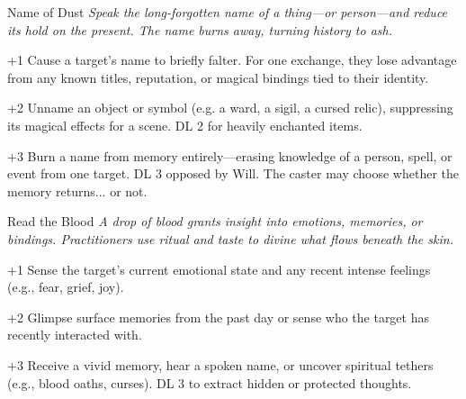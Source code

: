 \begin{WyrdSpell}[Ashcraft]{Name of Dust}\label{spell:name-of-dust}
    \textit{Speak the long-forgotten name of a thing—or person—and reduce its hold on the present. The name burns away, turning history to ash.}
    
    \begin{WyrdSpellBlock}
        \item[+1] Cause a target’s name to briefly falter. For one exchange, they lose advantage from any known titles, reputation, or magical bindings tied to their identity.
        
        \item[+2] Unname an object or symbol (e.g. a ward, a sigil, a cursed relic), suppressing its magical effects for a scene. DL 2 for heavily enchanted items.
        
        \item[+3] Burn a name from memory entirely—erasing knowledge of a person, spell, or event from one target. DL 3 opposed by Will. The caster may choose whether the memory returns... or not.
    \end{WyrdSpellBlock}
\end{WyrdSpell}

\begin{WyrdSpell}[Bloodbinding]{Read the Blood}\label{spell:read-the-blood}
\textit{A drop of blood grants insight into emotions, memories, or bindings. Practitioners use ritual and taste to divine what flows beneath the skin.}
    \begin{WyrdSpellBlock}
        \item[+1] Sense the target's current emotional state and any recent intense feelings (e.g., fear, grief, joy).
        \item[+2] Glimpse surface memories from the past day or sense who the target has recently interacted with.
        \item[+3] Receive a vivid memory, hear a spoken name, or uncover spiritual tethers (e.g., blood oaths, curses). DL 3 to extract hidden or protected thoughts.
    \end{WyrdSpellBlock}
\end{WyrdSpell}

